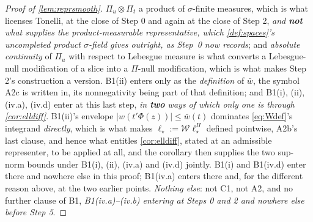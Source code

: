 \begin{proof}[Proof of \cref{lem:reprsmooth}]
$\Pi_u\otimes\Pi_t$ a product
of $\sigma$-finite measures, which is what licenses
Tonelli, at the close of Step 0 and again at the close of Step 2, \emph{and \textbf{not} what supplies
the product-measurable representative, which \cref{def:spaces}'s uncompleted product $\sigma$-field gives
outright, as Step~0 now records}; and \emph{absolute continuity} of $\Pi_u$ with
respect to Lebesgue measure is what converts a Lebesgue-null modification of a slice into a $\Pi$-null
modification, which is what makes Step 2's construction a version. B1(ii) enters only as the
\emph{definition} of $\bar w$, the symbol A2c is written in, its nonnegativity being part of that
definition; and B1(i), (ii), (iv.a), (iv.d) enter at this last step, \emph{in \textbf{two} ways of which only one
is through \cref{cor:elldiff}}. B1(ii)'s envelope $|w(t'\Phi(z))|\le\bar w(t)$ dominates
\eqref{eq:Wdef}'s integrand \emph{directly}, which is what makes $\ell_\star:=\mathcal W\ell^\Pi_\star$
defined pointwise, A2b's last clause, and hence what entitles \cref{cor:elldiff}, stated at an
admissible representer, to be applied at all, and the corollary then supplies the two sup-norm bounds
under B1(i), (ii), (iv.a) and (iv.d) jointly. B1(i) and B1(iv.d) enter there and nowhere else in this proof; B1(iv.a)
enters there and, for the different reason above, at the two earlier points. \emph{Nothing
else}: not C1, not A2, and no further clause of B1, \emph{B1(iv.a)--(iv.b) entering at Steps 0 and
2 and nowhere else before Step 5}.

\end{proof}
